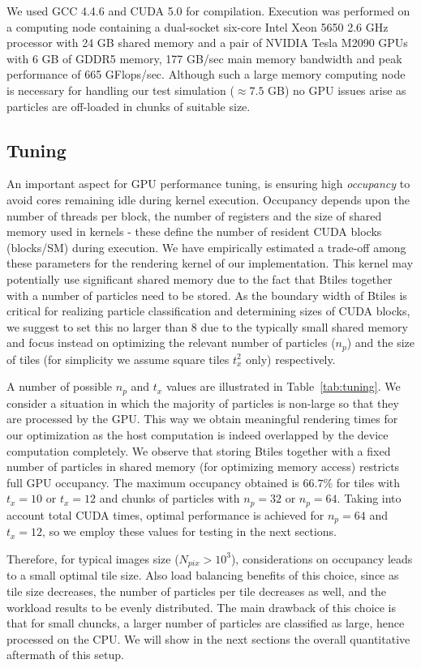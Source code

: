 \documentclass[1p]{elsarticle}
\begin{document}
We used GCC 4.4.6 and CUDA 5.0 for compilation. Execution was performed on a computing node containing a dual-socket six-core Intel Xeon 5650 2.6 GHz processor with 24 GB shared memory and a pair of NVIDIA Tesla M2090 GPUs with 6 GB of GDDR5 memory, 177 GB/sec main memory bandwidth and peak performance of 665 GFlops/sec. Although such a large memory computing node is necessary for handling our test simulation ($\approx 7.5$ GB) no GPU issues arise as particles are off-loaded in chunks of suitable size. 

\subsection{Tuning}
\label{sec:gpuperf}
An important aspect for GPU performance tuning, is ensuring high {\it occupancy} to avoid cores remaining idle during kernel execution. Occupancy depends upon the number of threads per block, the number of registers and the size of shared memory used in kernels - these define the number of resident CUDA blocks (blocks/SM) during execution. We have empirically estimated a trade-off among these parameters for the rendering kernel of our implementation. This kernel may potentially use significant shared memory due to the fact that Btiles together with a number of particles need to be stored. As the boundary width of Btiles is critical for realizing particle classification and determining sizes of CUDA blocks, we suggest to set this no larger than 8 due to the typically small shared memory and focus instead on optimizing the relevant number of particles ($n_p$) and the size of tiles (for simplicity we assume square tiles $t_x^2$ only) respectively.

A number of possible $n_p$ and $t_x$ values are illustrated in Table~\ref{tab:tuning}. We consider a situation in which the majority of particles is non-large so that they are processed by the GPU. This way we obtain meaningful rendering times for our optimization as the host computation is indeed overlapped by the device computation completely. We observe that storing Btiles together with a fixed number of particles in shared memory (for optimizing memory access) restricts full GPU occupancy. The maximum occupancy obtained is $66.7\%$ for tiles with $t_x = 10$ or $t_x = 12$ and chunks of particles with $n_p = 32$ or $n_p=64$. Taking into account total CUDA times, optimal performance is achieved for $n_p=64$ and $t_x = 12$, so we employ these values for testing in the next sections.

Therefore, for typical images size ($N_{pix} > 10^3$), considerations on occupancy leads to a small optimal tile size. Also load balancing benefits of this choice, since 
as tile size decreases, the number of particles per tile decreases as well, and the workload results to be evenly distributed.
The main drawback of this choice is that for small chuncks, a larger number of particles are classified as large, hence processed on the CPU. We will show in the next sections the overall quantitative aftermath of this setup.  
\end{document}
